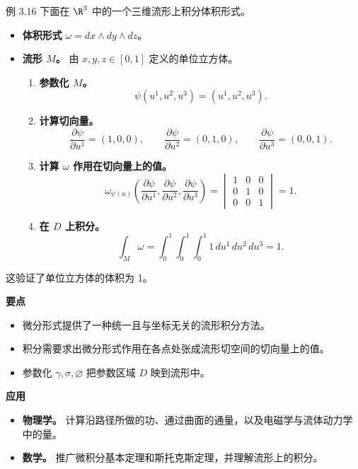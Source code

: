 \begin{statement}{例 3.16}{}
下面在 $\R^3$ 中的一个三维流形上积分体积形式。
\begin{itemize}
\item \textbf{体积形式} $\omega=dx\wedge dy\wedge dz$。
\item \textbf{流形 $M$。} 由 $x,y,z\in[0,1]$ 定义的单位立方体。
\begin{enumerate}
\item \textbf{参数化 $M$。}
\[
  \psi(u^1,u^2,u^3)=(u^1,u^2,u^3).
\]
\item \textbf{计算切向量。}
\[
  \frac{\partial\psi}{\partial u^1}=(1,0,0),\qquad
  \frac{\partial\psi}{\partial u^2}=(0,1,0),\qquad
  \frac{\partial\psi}{\partial u^3}=(0,0,1).
\]
\item \textbf{计算 $\omega$ 作用在切向量上的值。}
\[
  \omega_{\psi(u)}\left(\frac{\partial\psi}{\partial u^1},
  \frac{\partial\psi}{\partial u^2},\frac{\partial\psi}{\partial u^3}\right)
   =\begin{vmatrix}1&0&0\\0&1&0\\0&0&1\end{vmatrix}=1.
\]
\item \textbf{在 $D$ 上积分。}
\[
  \int_M\omega=\int_0^1\!\!\int_0^1\!\!\int_0^1
   1\,du^1\,du^2\,du^3=1.
\]
\end{enumerate}
\end{itemize}
这验证了单位立方体的体积为 1。

\noindent\textbf{要点}
\begin{itemize}
\item 微分形式提供了一种统一且与坐标无关的流形积分方法。
\item 积分需要求出微分形式作用在各点处张成流形切空间的切向量上的值。
\item 参数化 $\gamma,\sigma,\varnothing$ 把参数区域 $D$ 映到流形中。%
\end{itemize}

\noindent\textbf{应用}
\begin{itemize}
\item \textbf{物理学。} 计算沿路径所做的功、通过曲面的通量，以及电磁学与流体动力学中的量。
\item \textbf{数学。} 推广微积分基本定理和斯托克斯定理，并理解流形上的积分。
\end{itemize}
\end{statement}

